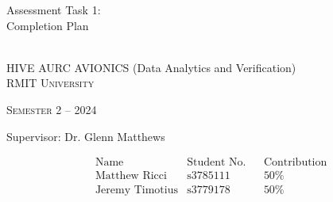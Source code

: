 \documentclass[a4paper, oneside]{memoir}
\newcommand*{\semester}[2]{Semester #1 -- #2} %
\newcommand*{\student}[3]{&\text{#1} &\text{#2} &&\text{#3}} %
\newcommand*{\titleAM}[4]%
{\begingroup
  \centering
  {\Huge Assessment Task 1:\\#3\par}\\[\baselineskip]
  {\Large HIVE AURC AVIONICS (Data Analytics and Verification)}\\[\baselineskip]
  {\small\scshape RMIT University}\par
  {\small\scshape #4}\par\vspace{0.5em}
  {\large Supervisor: #1}\par\vspace{0.5em}
  \endgroup}
\begin{document}
  \titleAM{Dr. Glenn Matthews}{2}{Completion Plan}{\semester{2}{2024}}
  \begin{align*}
    &\text{Name} &\text{Student No.} &&\text{Contribution}\\
    \student{Matthew Ricci}{s3785111}{50\%}\\
    \student{Jeremy Timotius}{s3779178}{50\%}
  \end{align*}
  \tableofcontents*
  \clearpage
  \renewcommand{\abstractname}{Summary}

  \markboth{}{}
  

  
  \printbibliography

  
\end{document}
